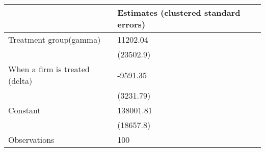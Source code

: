 \begin{tabular}{ll}
\toprule
{} & Estimates (clustered standard errors) \\
\midrule
Treatment group(gamma)         &                              11202.04 \\
                               &                             (23502.9) \\
When a firm is treated (delta) &                              -9591.35 \\
                               &                             (3231.79) \\
Constant                       &                             138001.81 \\
                               &                             (18657.8) \\
Observations                   &                                   100 \\
\bottomrule
\end{tabular}
